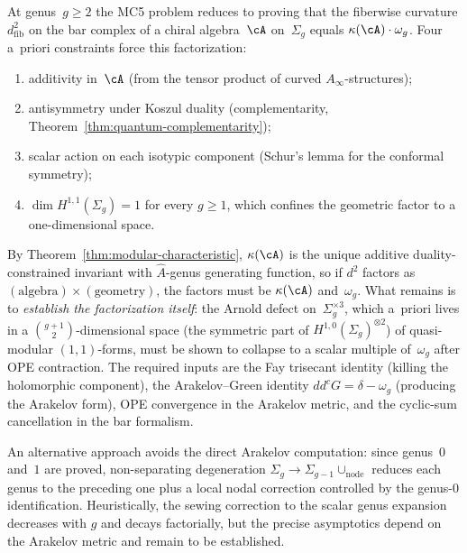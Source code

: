 \begin{remark}
\label{rem:arakelov-bar-transfer}
At genus~$g \ge 2$ the MC5 problem reduces to proving that the
fiberwise curvature $d_{\mathrm{fib}}^2$ on the bar complex of a
chiral algebra~$\cA$ on~$\Sigma_g$ equals
$\kappa(\cA) \cdot \omega_g$. Four a~priori constraints force this
factorization:
\begin{enumerate}[label=\textup{(\roman*)}]
\item additivity in~$\cA$ (from the tensor product of curved
 $A_\infty$-structures);
\item antisymmetry under Koszul duality (complementarity,
 Theorem~\ref{thm:quantum-complementarity});
\item scalar action on each isotypic component (Schur's lemma for the
 conformal symmetry);
\item $\dim H^{1,1}(\Sigma_g) = 1$ for every $g \ge 1$, which
 confines the geometric factor to a one-dimensional space.
\end{enumerate}
By Theorem~\ref{thm:modular-characteristic},
$\kappa(\cA)$ is the unique additive duality-constrained invariant with
$\hat{A}$-genus generating function, so if $d^2$ factors as
$(\text{algebra})\times(\text{geometry})$, the factors must be
$\kappa(\cA)$ and~$\omega_g$. What remains is to \emph{establish
the factorization itself}: the Arnold defect on~$\Sigma_g^{\times 3}$,
which a~priori lives in a $\binom{g+1}{2}$-dimensional space
(the symmetric part of $H^{1,0}(\Sigma_g)^{\otimes 2}$) of
quasi-modular $(1,1)$-forms, must be shown to collapse to a scalar
multiple
of~$\omega_g$ after OPE contraction. The required inputs are the Fay
trisecant identity (killing the holomorphic component), the
Arakelov--Green identity $dd^c G = \delta - \omega_g$ (producing the
Arakelov form), OPE convergence in the Arakelov metric, and the
cyclic-sum cancellation in the bar formalism.

An alternative approach avoids the direct Arakelov computation: since
genus~$0$ and~$1$ are proved, non-separating degeneration
$\Sigma_g \to \Sigma_{g-1} \cup_{\mathrm{node}}$ reduces each genus
to the preceding one plus a local nodal correction controlled by the
genus-$0$ identification. Heuristically, the sewing correction
to the scalar genus expansion decreases with $g$ and decays
factorially, but the precise asymptotics depend on the Arakelov
metric and remain to be established.
\end{remark}

